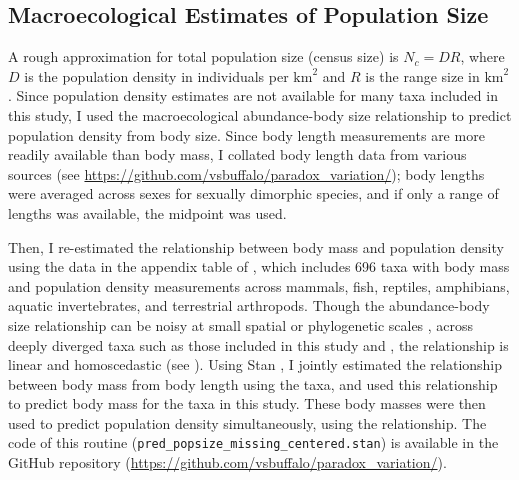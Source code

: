 \documentclass[9pt,lineno]{elife}
\begin{document}
\subsection{Macroecological Estimates of Population Size}
\label{sec:methods-popsize}

A rough approximation for total population size (census size) is $N_c = D R$,
where $D$ is the population density in individuals per $\text{km}^2$ and $R$ is
the range size in $\text{km}^2$. Since population density estimates are not
available for many taxa included in this study, I used the macroecological
abundance-body size relationship to predict population density from body size.
Since body length measurements are more readily available than body mass, I
collated body length data from various sources (see
\url{https://github.com/vsbuffalo/paradox_variation/}); body lengths were
averaged across sexes for sexually dimorphic species, and if only a range of
lengths was available, the midpoint was used.

Then, I re-estimated the relationship between body mass and population density
using the data in the appendix table of \cite{Damuth1987-sg}, which
includes 696 taxa with body mass and population density measurements across
mammals, fish, reptiles, amphibians, aquatic invertebrates, and terrestrial
arthropods. Though the abundance-body size relationship can be noisy at small
spatial or phylogenetic scales \citep[Chapter 5,][]{Gaston2008-pn}, across
deeply diverged taxa such as those included in this study and
\cite{Damuth1987-sg}, the relationship is linear and homoscedastic (see
). Using Stan
\citep{Stan_Development_Team2020-ea}, I jointly estimated the relationship
between body mass from body length using the \cite{Romiguier2014-bp} taxa,
and used this relationship to predict body mass for the taxa in this study.
These body masses were then used to predict population density simultaneously,
using the \cite{Damuth1981-st} relationship. The code of this routine
(\texttt{pred\_popsize\_missing\_centered.stan}) is available in the GitHub
repository (\url{https://github.com/vsbuffalo/paradox_variation/}).
\end{document}
